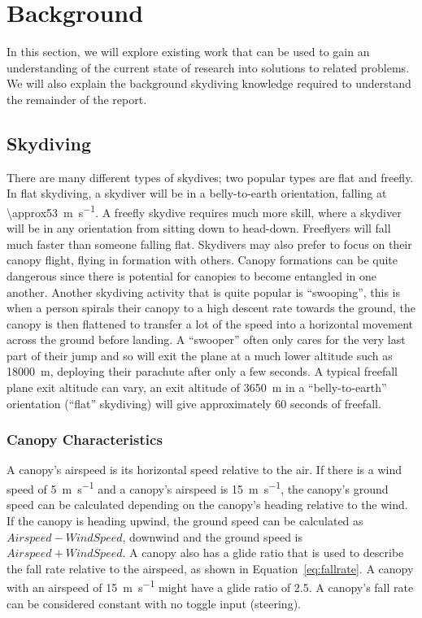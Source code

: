 \section{Background}\label{sec:further-background}
In this section, we will explore existing work that can be used to gain an understanding of the current state of research into solutions to related problems. We will also explain the background skydiving knowledge required to understand the remainder of the report.



\subsection{Skydiving}
There are many different types of skydives; two popular types are flat and freefly. In flat skydiving, a skydiver will be in a belly-to-earth orientation, falling at \SI{\approx53}{\metre\per\second}. A freefly skydive requires much more skill, where a skydiver will be in any orientation from sitting down to head-down. Freeflyers will fall much faster than someone falling flat.
Skydivers may also prefer to focus on their canopy flight, flying in formation with others. Canopy formations can be quite dangerous since there is potential for canopies to become entangled in one another.
Another skydiving activity that is quite popular is ``swooping'', this is when a person spirals their canopy to a high descent rate towards the ground, the canopy is then flattened to transfer a lot of the speed into a horizontal movement across the ground before landing. A ``swooper'' often only cares for the very last part of their jump and so will exit the plane at a much lower altitude such as \SI{18000}{\metre}, deploying their parachute after only a few seconds.
A typical freefall plane exit altitude can vary, an exit altitude of \SI{3650}{\metre} in a ``belly-to-earth'' orientation (``flat'' skydiving) will give approximately 60 seconds of freefall.

\subsubsection{Canopy Characteristics}
A canopy's airspeed is its horizontal speed relative to the air. If there is a wind speed of \SI{5}{\metre\per\second} and a canopy's airspeed is \SI{15}{\metre\per\second}, the canopy's ground speed can be calculated depending on the canopy's heading relative to the wind. If the canopy is heading upwind, the ground speed can be calculated as $Airspeed - WindSpeed$, downwind and the ground speed is $Airspeed + WindSpeed$.
A canopy also has a glide ratio that is used to describe the fall rate relative to the airspeed, as shown in Equation~\ref{eq:fallrate}. A canopy with an airspeed of \SI{15}{\metre\per\second} might have a glide ratio of 2.5. A canopy's fall rate can be considered constant with no toggle input (steering).

